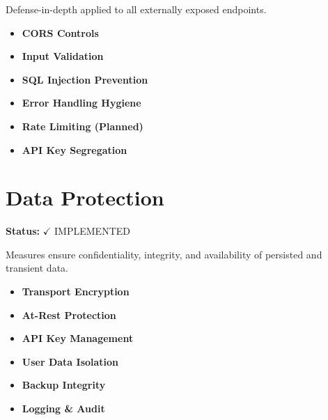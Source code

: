 Defense-in-depth applied to all externally exposed endpoints.
\begin{itemize}
    \item \textbf{CORS Controls}%
    \item \textbf{Input Validation}%
    \item \textbf{SQL Injection Prevention}%
    \item \textbf{Error Handling Hygiene}%
    \item \textbf{Rate Limiting (Planned)}%
    \item \textbf{API Key Segregation}%
\end{itemize}

\section{Data Protection}
\textbf{Status:} $\checkmark$ IMPLEMENTED

Measures ensure confidentiality, integrity, and availability of persisted and transient data.
\begin{itemize}
    \item \textbf{Transport Encryption}%
    \item \textbf{At-Rest Protection}%
    \item \textbf{API Key Management}%
    \item \textbf{User Data Isolation}%
    \item \textbf{Backup Integrity}%
    \item \textbf{Logging \& Audit}%
\end{itemize}

